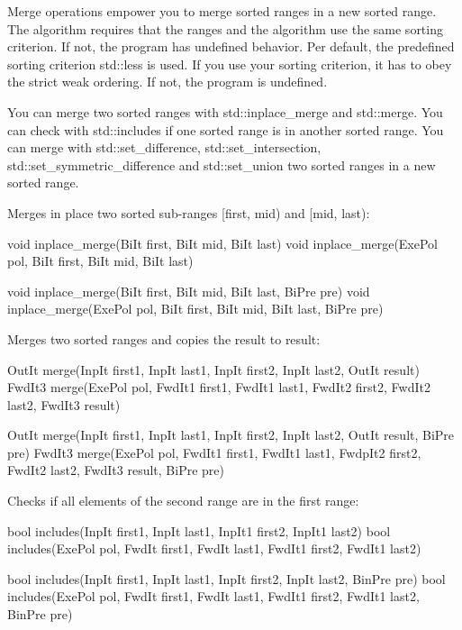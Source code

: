 Merge operations empower you to merge sorted ranges in a new sorted range. The algorithm requires that the ranges and the algorithm use the same sorting criterion. If not, the program has undefined behavior. Per default, the predefined sorting criterion std::less is used. If you use your sorting criterion, it has to obey the strict weak ordering. If not, the program is undefined.

You can merge two sorted ranges with std::inplace\_merge and std::merge. You can check with std::includes if one sorted range is in another sorted range. You can merge with std::set\_difference, std::set\_intersection, std::set\_symmetric\_difference and std::set\_union two sorted ranges in a new sorted range.

Merges in place two sorted sub-ranges [first, mid) and [mid, last):

\begin{cpp}
void inplace_merge(BiIt first, BiIt mid, BiIt last)
void inplace_merge(ExePol pol, BiIt first, BiIt mid, BiIt last)

void inplace_merge(BiIt first, BiIt mid, BiIt last, BiPre pre)
void inplace_merge(ExePol pol, BiIt first, BiIt mid, BiIt last, BiPre pre)
\end{cpp}

Merges two sorted ranges and copies the result to result:

\begin{cpp}
OutIt merge(InpIt first1, InpIt last1, InpIt first2, InpIt last2, OutIt result)
FwdIt3 merge(ExePol pol, FwdIt1 first1, FwdIt1 last1,
		     FwdIt2 first2, FwdIt2 last2, FwdIt3 result)

OutIt merge(InpIt first1, InpIt last1, InpIt first2, InpIt last2, OutIt result,
			BiPre pre)
FwdIt3 merge(ExePol pol, FwdIt1 first1, FwdIt1 last1,
			 FwdpIt2 first2, FwdIt2 last2, FwdIt3 result, BiPre pre)
\end{cpp}

Checks if all elements of the second range are in the first range:

\begin{cpp}
bool includes(InpIt first1, InpIt last1, InpIt1 first2, InpIt1 last2)
bool includes(ExePol pol, FwdIt first1, FwdIt last1, FwdIt1 first2, FwdIt1 last2)

bool includes(InpIt first1, InpIt last1, InpIt first2, InpIt last2, BinPre pre)
bool includes(ExePol pol, FwdIt first1, FwdIt last1,
			  FwdIt1 first2, FwdIt1 last2, BinPre pre)
\end{cpp}

